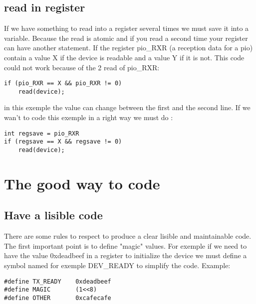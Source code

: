 \documentclass[11pt]{report}
\begin{document}
\subsection{read in register}
If we have something to read into a register several times we must save it into a variable. Because 
the read is atomic and if you read a second time your register can have another statement. If the 
register pio\_RXR (a reception data for a pio) contain a value X if the device is readable and a value
Y if it is not. This code could not work because of the 2 read of pio\_RXR:
\begin{lstlisting}
if (pio_RXR == X && pio_RXR != 0)
	read(device);
\end{lstlisting}
in this exemple the value can change between the first and the second line.
If we wan't to code this exemple in a right way we must do :
\begin{lstlisting}
int regsave = pio_RXR
if (regsave == X && regsave != 0)
	read(device);
\end{lstlisting}

\section{The good way to code}

\subsection{Have a lisible code}
There are some rules to respect to produce a clear lisible and maintainable code. The first important 
point is to define "magic" values. For exemple if we need to have the value 0xdeadbeef in a register 
to initialize the device we must define a symbol named for exemple DEV\_READY to simplify the code.
Example: 
\begin{lstlisting}
#define TX_READY	0xdeadbeef
#define MAGIC		(1<<8)
#define	OTHER		0xcafecafe
\end{lstlisting} 	
\end{document}
